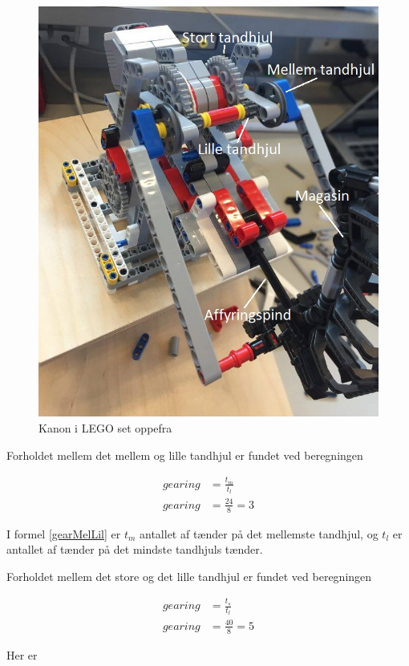 \begin{figure}[H]
	\centering
	\includegraphics[width=1\textwidth]{Afsnit/DesignOgImplementering/images/kanonOppefra}
	\caption{Kanon i LEGO set oppefra}
	\label{fig:kanonOppefra}
\end{figure}

Forholdet mellem det mellem og lille tandhjul er fundet ved beregningen 

\begin{align}
	gearing&=\frac{t_{m}}{t_{l}} \\ \nonumber 
	gearing&= \frac{24}{8} = 3
	\label{gearMelLil}
\end{align}

I formel \ref{gearMelLil} er $t_{m}$ antallet af tænder på det mellemste tandhjul, og $t_{l}$ er antallet af tænder på det mindste tandhjuls tænder. 

Forholdet mellem det store og det lille tandhjul er fundet ved beregningen 

\begin{align}
	gearing&= \frac{t_{s}}{t_{l}} \\ \nonumber 
	gearing &= \frac{40}{8}=5
\end{align}

Her er 









